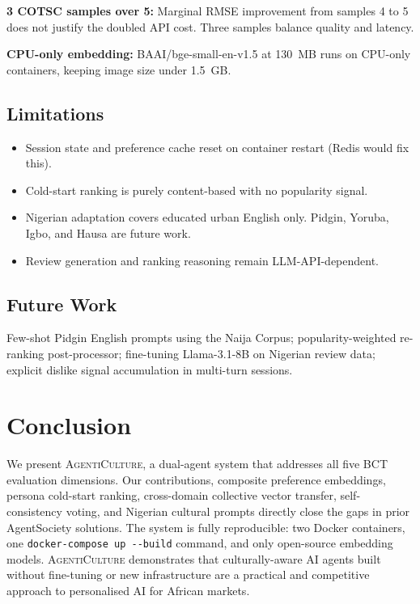 \documentclass[11pt]{article}
\newcommand{\system}{\textsc{AgentiCulture}\xspace}
\begin{document}
\noindent\textbf{3 COTSC samples over 5:} 
Marginal RMSE improvement from samples 4 to 5 does not justify the doubled API cost. Three samples balance quality and latency.

\noindent\textbf{CPU-only embedding:} 
BAAI/bge-small-en-v1.5 at 130~MB runs on CPU-only containers, keeping image size under 1.5~GB.

\subsection{Limitations}
\begin{itemize}
  \item Session state and preference cache reset on container restart (Redis would fix this).
  \item Cold-start ranking is purely content-based with no popularity signal.
  \item Nigerian adaptation covers educated urban English only. Pidgin, Yoruba, Igbo, and Hausa are future work.
  \item Review generation and ranking reasoning remain LLM-API-dependent.
\end{itemize}

\subsection{Future Work}
Few-shot Pidgin English prompts using the Naija Corpus; popularity-weighted re-ranking post-processor; fine-tuning Llama-3.1-8B on Nigerian review data; explicit dislike signal accumulation in multi-turn sessions.

\section{Conclusion}

We present \system, a dual-agent system that addresses all five BCT evaluation dimensions. Our contributions, composite preference embeddings, persona cold-start ranking, cross-domain collective vector transfer, self-consistency voting, and Nigerian cultural prompts directly close the gaps in prior AgentSociety solutions. The system is fully reproducible: two Docker containers, one \texttt{docker-compose up -{}-build} command, and only open-source embedding models. \system demonstrates that culturally-aware AI agents built without fine-tuning or new infrastructure are a practical and competitive approach to personalised AI for African markets.



\end{document}
